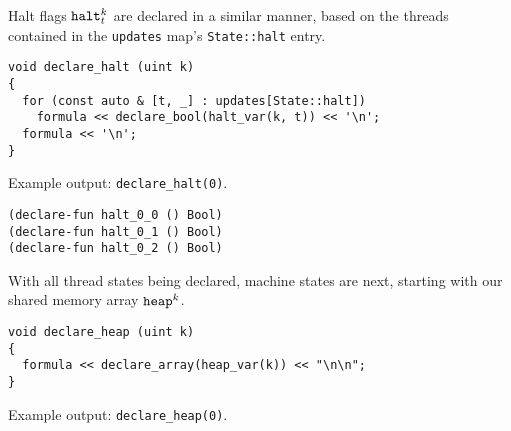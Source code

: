 

\noindent
Halt flags $\texttt{halt}^k_t$ are declared in a similar manner, based on the threads contained in the \texttt{updates} map's \texttt{State::halt} entry.

\begin{lstlisting}[style=c++]
void declare_halt (uint k)
{
  for (const auto & [t, _] : updates[State::halt])
    formula << declare_bool(halt_var(k, t)) << '\n';
  formula << '\n';
}
\end{lstlisting}

\noindent
Example output: \lstinline[style=c++]{declare_halt(0)}.

\begin{lstlisting}[language=SMTLib]
(declare-fun halt_0_0 () Bool)
(declare-fun halt_0_1 () Bool)
(declare-fun halt_0_2 () Bool)
\end{lstlisting}



\noindent
With all thread states being declared, machine states are next, starting with our shared memory array $\texttt{heap}^k$.

\begin{lstlisting}[style=c++]
void declare_heap (uint k)
{
  formula << declare_array(heap_var(k)) << "\n\n";
}
\end{lstlisting}

\noindent
Example output: \lstinline[style=c++]{declare_heap(0)}.

